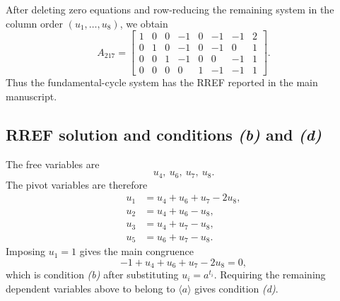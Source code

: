 \documentclass[11pt]{article}
\newcommand{\SpanA}{\langle a\rangle}
\begin{document}
After deleting zero equations and row-reducing the remaining system in the column order $(u_1,\ldots,u_8)$, we obtain
\[
A_{217}=
\begin{bmatrix}
1 & 0 & 0 & -1 & 0 & -1 & -1 & 2 \\
0 & 1 & 0 & -1 & 0 & -1 & 0 & 1 \\
0 & 0 & 1 & -1 & 0 & 0 & -1 & 1 \\
0 & 0 & 0 & 0 & 1 & -1 & -1 & 1
\end{bmatrix}.
\]
Thus the fundamental-cycle system has the RREF reported in the main manuscript.

\subsection{RREF solution and conditions \emph{(b)} and \emph{(d)}}
The free variables are
\[
u_{4},\ u_{6},\ u_{7},\ u_{8}.
\]
The pivot variables are therefore
\[
\begin{aligned}
u_{1}&=u_{4} + u_{6} + u_{7} - 2u_{8},\\
u_{2}&=u_{4} + u_{6} - u_{8},\\
u_{3}&=u_{4} + u_{7} - u_{8},\\
u_{5}&=u_{6} + u_{7} - u_{8}.
\end{aligned}
\]
Imposing $u_1=1$ gives the main congruence
\[
-1 + u_{4} + u_{6} + u_{7} - 2u_{8}=0,
\]
which is condition \emph{(b)} after substituting $u_i=a^{t_i}$.  Requiring the remaining dependent variables above to belong to $\SpanA$ gives condition \emph{(d)}.
\end{document}
